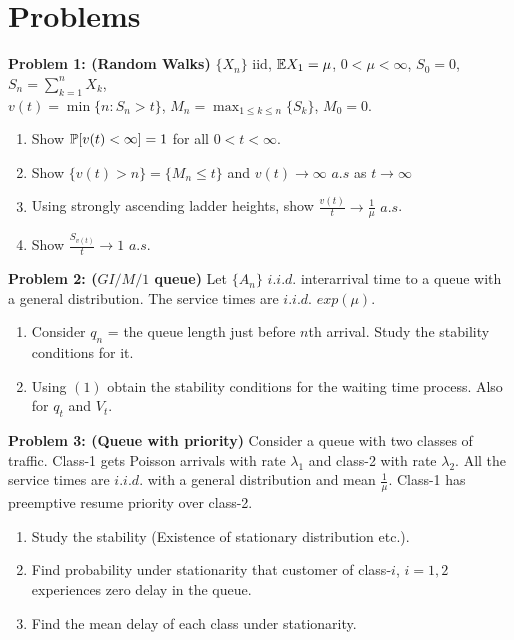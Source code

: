 \documentclass[all-lectures.tex]{subfiles}
\begin{document}
\section*{Problems}

\noindent \textbf{Problem 1: (Random Walks)} $\{X_n\}$ iid, \quad $\E{X_1} = \mu$, \quad $0<\mu<\infty$, \quad $S_0 = 0$, \quad $S_n = \sum_{k=1}^{n} X_k$,\\
$v(t) = \min \{n:S_n>t\}$, \quad $M_n = \max_{1\le k \le n} \{S_k\}$, \quad $M_0 = 0$.
\begin{enumerate}
\item Show $\P[v(t) < \infty] = 1$  for all $0<t<\infty$.
\item Show $\{v(t) > n \} = \{M_n \le t\}$ and $v(t) \to \infty$ $a.s$ as $t \to \infty$
\item Using strongly ascending ladder heights, show $\frac{v(t)}{t} \to \frac{1}{\mu}$ $a.s$.
\item Show $\frac{S_{v(t)}}{t} \to 1 $ $a.s$.
\end{enumerate}

\noindent \textbf{Problem 2: ($GI/M/1$ queue)} Let $\{A_n\}$ $i.i.d.$ interarrival time to a queue with a general distribution. 
The service times are $i.i.d.$ $exp(\mu)$.
\begin{enumerate}
\item Consider $q_n$ = the queue length just before $n$th arrival. 
Study the stability conditions for it.
\item Using $(1)$ obtain the stability conditions for the waiting time process. 
Also for $q_t$ and $V_t$.
\end{enumerate}

\noindent \textbf{Problem 3: (Queue with priority)} Consider a queue with two classes of traffic. 
Class-1 gets Poisson arrivals with rate $\lambda_1$ and class-2 with rate $\lambda_2$. 
All the service times are $i.i.d.$ with a general distribution and mean $\frac{1}{\mu}$. 
Class-1 has preemptive resume priority over class-2.
\begin{enumerate}
\item Study the stability (Existence of stationary distribution etc.).
\item Find probability under stationarity that customer of class-$i$, $i=1,2$ experiences zero delay in the queue.
\item Find the mean delay of each class under stationarity.
\end{enumerate}
\end{document}
